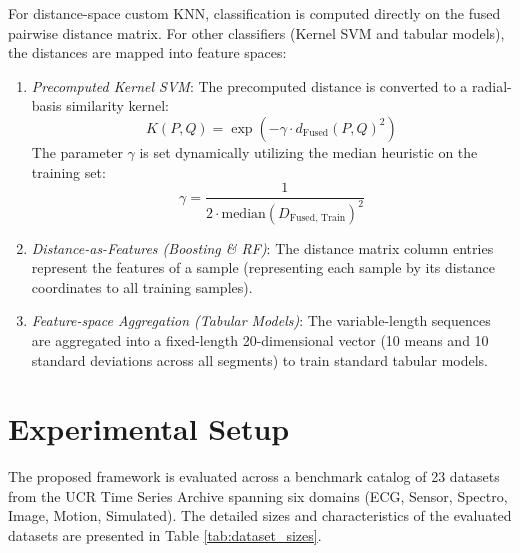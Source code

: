 \documentclass[conference]{IEEEtran}
\begin{document}
For distance-space custom KNN, classification is computed directly on the fused pairwise distance matrix. For other classifiers (Kernel SVM and tabular models), the distances are mapped into feature spaces:
\begin{enumerate}
    \item \textit{Precomputed Kernel SVM}: The precomputed distance is converted to a radial-basis similarity kernel:
    \begin{equation}
    K(P, Q) = \exp\left( -\gamma \cdot d_{\text{Fused}}(P, Q)^2 \right)
    \label{eq:kernel_svm}
    \end{equation}
    The parameter $\gamma$ is set dynamically utilizing the median heuristic on the training set:
    \begin{equation}
    \gamma = \frac{1}{2 \cdot \text{median}(D_{\text{Fused, Train}})^2}
    \label{eq:gamma_median}
    \end{equation}
    \item \textit{Distance-as-Features (Boosting \& RF)}: The distance matrix column entries represent the features of a sample (representing each sample by its distance coordinates to all training samples).
    \item \textit{Feature-space Aggregation (Tabular Models)}: The variable-length sequences are aggregated into a fixed-length 20-dimensional vector (10 means and 10 standard deviations across all segments) to train standard tabular models.
\end{enumerate}

\section{Experimental Setup}

The proposed framework is evaluated across a benchmark catalog of 23 datasets from the UCR Time Series Archive spanning six domains (ECG, Sensor, Spectro, Image, Motion, Simulated). The detailed sizes and characteristics of the evaluated datasets are presented in Table \ref{tab:dataset_sizes}.
\end{document}
